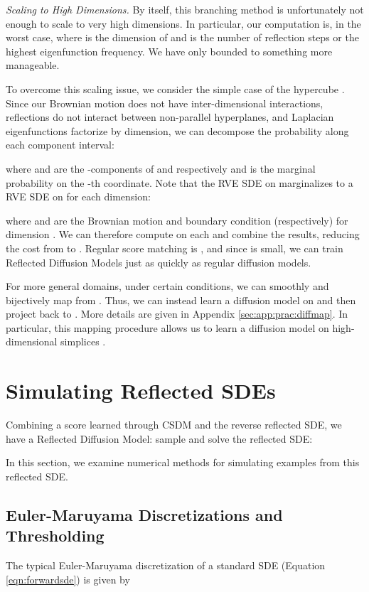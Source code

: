 \documentclass{article}
\theoremstyle{plain}
\theoremstyle{definition}
\theoremstyle{remark}
\begin{document}
\textit{Scaling to High Dimensions.} By itself, this branching method is unfortunately not enough to scale to very high dimensions. In particular, our computation is, in the worst case,  where  is the dimension of  and  is the number of reflection steps or the highest eigenfunction frequency. We have only bounded  to something more manageable. 

To overcome this scaling issue, we consider the simple case of the hypercube . Since our Brownian motion does not have inter-dimensional interactions, reflections do not interact between non-parallel hyperplanes, and Laplacian eigenfunctions factorize by dimension, we can decompose the probability along each component interval:

where  and  are the -components of  and  respectively and  is the marginal probability on the -th coordinate. Note that the RVE SDE on  marginalizes to a RVE SDE on  for each dimension:

where  and  are the Brownian motion and boundary condition (respectively) for dimension . We can therefore compute on each  and combine the results, reducing the cost from  to . Regular score matching is , and since  is small, we can train Reflected Diffusion Models just as quickly as regular diffusion models.

For more general domains, under certain conditions, we can smoothly and bijectively map from . Thus, we can instead learn a diffusion model on  and then project back to . More details are given in Appendix \ref{sec:app:prac:diffmap}. In particular, this mapping procedure allows us to learn a diffusion model on high-dimensional simplices .
%
 \section{Simulating Reflected SDEs}

Combining a score  learned through CSDM and the reverse reflected SDE, we have a Reflected Diffusion Model: sample  and solve the reflected SDE:

In this section, we examine numerical methods for simulating examples from this reflected SDE.

\subsection{Euler-Maruyama Discretizations and Thresholding}

The typical Euler-Maruyama discretization of a standard SDE (Equation \ref{eqn:forwardsde}) is given by
\end{document}
